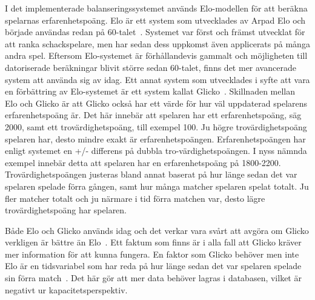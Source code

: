 \documentclass[a4paper, 11pt]{article}
\begin{document}
I det implementerade balanseringssystemet används Elo-modellen för att beräkna spelarnas erfarenhetspoäng. Elo är ett system som utvecklades av Arpad Elo och började användas redan på 60-talet~\cite{elo}. Systemet var först och främst utvecklat för att ranka schackspelare, men har sedan dess uppkomst även applicerats på många andra spel. Eftersom Elo-systemet är förhållandevis gammalt och möjligheten till datoriserade beräkningar blivit större sedan 60-talet, finns det mer avancerade system att använda sig av idag. Ett annat system som utvecklades i syfte att vara en förbättring av Elo-systemet är ett system kallat Glicko~\cite{chessratings}. Skillnaden mellan Elo och Glicko är att Glicko också har ett värde för hur väl uppdaterad spelarens erfarenhetspoäng är. Det här innebär att spelaren har ett erfarenhetspoäng, säg 2000, samt ett trovärdighetspoäng, till exempel 100. Ju högre trovärdighetspoäng spelaren har, desto mindre exakt är erfarenhetspoängen. Erfarenhetspoängen har enligt systemet en +/- differens på dubbla tro-värdighetspoängen. I nyss nämnda exempel innebär detta att spelaren har en erfarenhetspoäng på 1800-2200. Trovärdighetspoängen justeras bland annat baserat på hur länge sedan det var spelaren spelade förra gången, samt hur många matcher spelaren spelat totalt. Ju fler matcher totalt och ju närmare i tid förra matchen var, desto lägre trovärdighetspoäng har spelaren.

Både Elo och Glicko används idag och det verkar vara svårt att avgöra om Glicko verkligen är bättre än Elo~\cite{stackchess}. Ett faktum som finns är i alla fall att Glicko kräver mer information för att kunna fungera. En faktor som Glicko behöver men inte Elo är en tidsvariabel som har reda på hur länge sedan det var spelaren spelade sin förra match~\cite{glickoex}. Det här gör att mer data behöver lagras i databasen, vilket är negativt ur kapacitetsperspektiv.
\end{document}
